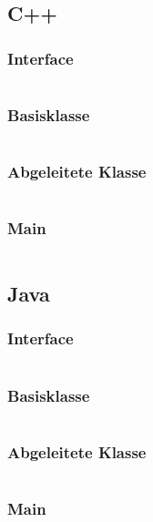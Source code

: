 \documentclass[12pt]{scrartcl}
\begin{document}
\subsection{C++}
\subsubsection{Interface}
\inputminted{cpp}{cpp/interface.h}
\subsubsection{Basisklasse}
\inputminted{cpp}{cpp/baseclass.h}
\subsubsection{Abgeleitete Klasse}
\inputminted{cpp}{cpp/derivedclass.h}
\subsubsection{Main}
\inputminted{cpp}{cpp/main.cpp}
\pagebreak

\subsection{Java}
\subsubsection{Interface}
\inputminted{java}{java/src/main/java/javademo/Interface.java}
\subsubsection{Basisklasse}
\inputminted{java}{java/src/main/java/javademo/Baseclass.java}
\subsubsection{Abgeleitete Klasse}
\inputminted{java}{java/src/main/java/javademo/Derivedclass.java}
\subsubsection{Main}
\inputminted{java}{java/src/main/java/javademo/Demo.java}
\pagebreak
\end{document}
